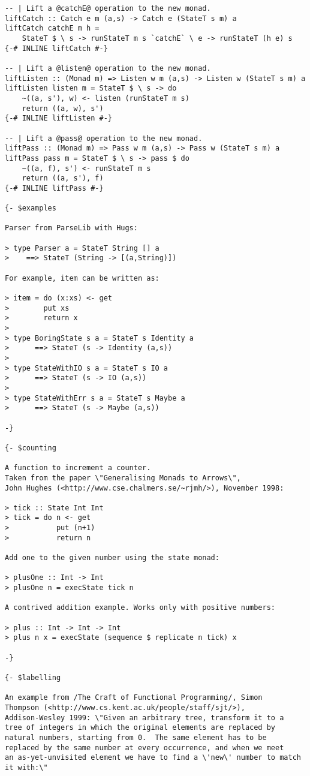 \begin{multicols}{2}
\begin{lstlisting}
-- | Lift a @catchE@ operation to the new monad.
liftCatch :: Catch e m (a,s) -> Catch e (StateT s m) a
liftCatch catchE m h =
    StateT $ \ s -> runStateT m s `catchE` \ e -> runStateT (h e) s
{-# INLINE liftCatch #-}

-- | Lift a @listen@ operation to the new monad.
liftListen :: (Monad m) => Listen w m (a,s) -> Listen w (StateT s m) a
liftListen listen m = StateT $ \ s -> do
    ~((a, s'), w) <- listen (runStateT m s)
    return ((a, w), s')
{-# INLINE liftListen #-}

-- | Lift a @pass@ operation to the new monad.
liftPass :: (Monad m) => Pass w m (a,s) -> Pass w (StateT s m) a
liftPass pass m = StateT $ \ s -> pass $ do
    ~((a, f), s') <- runStateT m s
    return ((a, s'), f)
{-# INLINE liftPass #-}

{- $examples

Parser from ParseLib with Hugs:

> type Parser a = StateT String [] a
>    ==> StateT (String -> [(a,String)])

For example, item can be written as:

> item = do (x:xs) <- get
>        put xs
>        return x
>
> type BoringState s a = StateT s Identity a
>      ==> StateT (s -> Identity (a,s))
>
> type StateWithIO s a = StateT s IO a
>      ==> StateT (s -> IO (a,s))
>
> type StateWithErr s a = StateT s Maybe a
>      ==> StateT (s -> Maybe (a,s))

-}

{- $counting

A function to increment a counter.
Taken from the paper \"Generalising Monads to Arrows\",
John Hughes (<http://www.cse.chalmers.se/~rjmh/>), November 1998:

> tick :: State Int Int
> tick = do n <- get
>           put (n+1)
>           return n

Add one to the given number using the state monad:

> plusOne :: Int -> Int
> plusOne n = execState tick n

A contrived addition example. Works only with positive numbers:

> plus :: Int -> Int -> Int
> plus n x = execState (sequence $ replicate n tick) x

-}

{- $labelling

An example from /The Craft of Functional Programming/, Simon
Thompson (<http://www.cs.kent.ac.uk/people/staff/sjt/>),
Addison-Wesley 1999: \"Given an arbitrary tree, transform it to a
tree of integers in which the original elements are replaced by
natural numbers, starting from 0.  The same element has to be
replaced by the same number at every occurrence, and when we meet
an as-yet-unvisited element we have to find a \'new\' number to match
it with:\"


\end{lstlisting}
\end{multicols}
